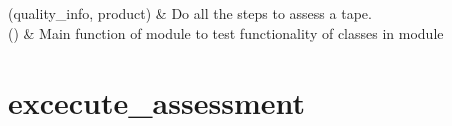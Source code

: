 \documentclass[letterpaper,10pt,english]{sphinxmanual}
\begin{document}
\begin{savenotes}\sphinxatlongtablestart\begin{longtable}[c]{}
\hline

\endfirsthead

%
{}\\
\hline

\endhead

\hline
{}\\
\endfoot

\endlastfoot

\sphinxAtStartPar
{\hyperref[\detokenize{generated/quality_assessment.quality_assessor.excecute_assessment:quality_assessment.quality_assessor.excecute_assessment}]{}}(quality\_info, product)
&
\sphinxAtStartPar
Do all the steps to assess a tape.
\\
\hline
\sphinxAtStartPar
{\hyperref[\detokenize{generated/quality_assessment.quality_assessor.main:quality_assessment.quality_assessor.main}]{}}()
&
\sphinxAtStartPar
Main function of module to test functionality of classes in module
\\
\hline
\end{longtable}\sphinxatlongtableend\end{savenotes}


\section{excecute\_assessment}
\label{\detokenize{generated/quality_assessment.quality_assessor.excecute_assessment:excecute-assessment}}\label{\detokenize{generated/quality_assessment.quality_assessor.excecute_assessment::doc}}
\end{document}
